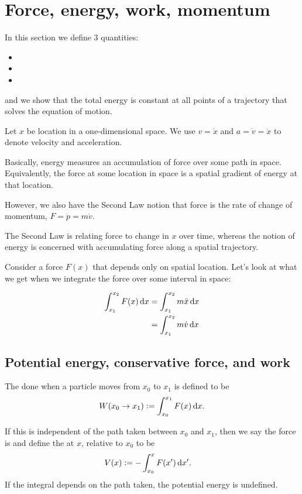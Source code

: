 \section{Force, energy, work, momentum}

In this section we define 3 quantities:
\begin{itemize}
\item {}
\item {}
\item {}
\end{itemize}
and we show that the total energy is constant at all points of a trajectory that solves the equation of motion.

Let $x$ be location in a one-dimensional space. We use $v = \dot{x}$ and $a = \dot{v} = \ddot{x}$ to
denote velocity and acceleration.

Basically, energy measures an accumulation of force over some path in space. Equivalently, the force
at some location in space is a spatial gradient of energy at that location.

However, we also have the Second Law notion that force is the rate of change of momentum,
$F = \dot{p} = m\dot{v}$.

The Second Law is relating force to change in $x$ over time, whereas the notion of energy is
concerned with accumulating force along a spatial trajectory.

Consider a force $F(x)$ that depends only on spatial location. Let's look at what we get when we
integrate the force over some interval in space:

\begin{align*}
  \int_{x_1}^{x_2} F(x) \dx
  &= \int_{x_1}^{x_2} m\ddot{x} \dx \\
  &= \int_{x_1}^{x_2} m\dot{v} \dx
\end{align*}

\subsection{Potential energy, conservative force, and work}

The  done when a particle moves from $x_0$ to $x_1$ is defined to be
\begin{align*}
  W(x_0 \to x_1) := \int_{x_0}^{x_1} F(x) \dx.
\end{align*}

If this is independent of the path taken between $x_0$ and $x_1$, then we say the force is
 and define the  at $x$, relative to $x_0$ to be
\begin{align*}
  V(x) &:= -\int_{x_0}^x F(x') \dx'.
\end{align*}
If the integral depends on the path taken, the potential energy is undefined.

